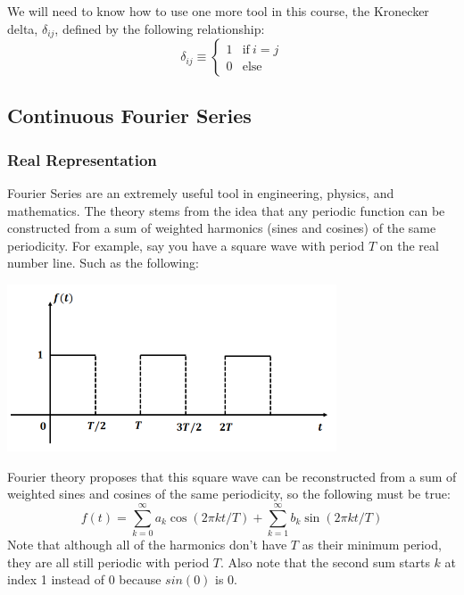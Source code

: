\documentclass[a4paper]{article}
\numberwithin{equation}{section}
\begin{document}
We will need to know how to use one more tool in this course, the Kronecker delta, $\delta_{ij}$, defined by the following relationship:
\begin{equation}
\delta_{ij} \equiv
\begin{cases} 
      1 & \text{if}\: i=j \\
      0 & \text{else}
   \end{cases}
\end{equation}
  

\subsection{Continuous Fourier Series}
\subsubsection{Real Representation}
Fourier Series are an extremely useful tool in engineering, physics, and mathematics. The theory stems from the idea that any periodic function can be constructed from a sum of weighted harmonics (sines and cosines) of the same periodicity. For example, say you have a square wave with period $T$ on the real number line. Such as the following:
\begin{center}
\includegraphics[scale=0.75]{squarewave.png}
\end{center}

Fourier theory proposes that this square wave can be reconstructed from a sum of weighted sines and cosines of the same periodicity, so the following must be true:
\begin{equation}\boxed{
f(t)=\sum_{k=0}^{\infty}a_k\cos{(2\pi kt/T)}+\sum_{k=1}^{\infty}b_k\sin{(2\pi kt/T)}}
\end{equation}
Note that although all of the harmonics don't have $T$ as their minimum period, they are all still periodic with period $T$. Also note that the second sum starts $k$ at index 1 instead of 0 because $sin{(0)}$ is 0.  \\
\smallskip
\end{document}
